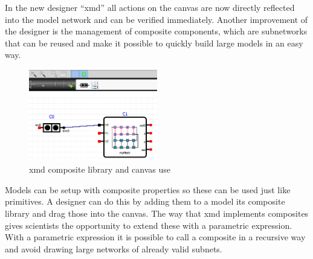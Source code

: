 In the new designer ``xmd'' all actions on the canvas are now directly reflected
into the model network and can be verified immediately. Another improvement of
the designer is the management of composite components, which are subnetworks
that can be reused and make it possible to quickly build large models in an easy
way.
\begin{figure}
  \vspace{-20pt}
  \begin{center}
    \includegraphics[width=0.50\textwidth]{composite-use}
  \end{center}
  \vspace{-20pt}
  \caption{xmd composite library and canvas use}
\label{fig:composite-use}
  \vspace{-10pt}
\end{figure}
Models can be setup with composite properties so these can be used just
like primitives. A designer can do this by adding them to a model its composite
library and drag those into the canvas. The way that xmd implements composites
gives scientists the opportunity to extend these with a parametric expression.
With a parametric expression it is possible to call a composite in a recursive
way and avoid drawing large networks of already valid subnets.

\newpage